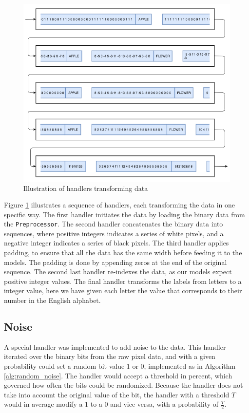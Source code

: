 \begin{figure}[H]
    \centering
    \includegraphics[width=1\textwidth]{fig/development_process/transformator.png}
    \caption{Illustration of handlers transforming data}
    \label{fig:development-transformator}
\end{figure}

Figure \ref{fig:development-transformator} illustrates a sequence of handlers, each transforming the data in one specific way. The first handler initiates the data by loading the binary data from the {\tt Preprocessor}. The second handler concatenates the binary data into sequences, where positive integers indicates a series of white pixels, and a negative integer indicates a series of black pixels. The third handler applies padding, to ensure that all the data has the same width before feeding it to the models. The padding is done by appending zeros at the end of the original sequence. The second last handler re-indexes the data, as our models expect positive integer values. The final handler transforms the labels from letters to a integer value, here we have given each letter the value that corresponds to their number in the English alphabet.

\subsection{Noise}
A special handler was implemented to add noise to the data. This handler iterated over the binary bits from the raw pixel data, and with a given probability could set a random bit value \(1\) or \(0\), implemented as in Algorithm \ref{alg:random_noise}. The handler would accept a threshold in percent, which governed how often the bits could be randomized. Because the handler does not take into account the original value of the bit, the handler with a threshold \(T\) would in average modify a \(1\) to a \(0\) and vice versa, with a probability of \(\frac{T}{2}\).

